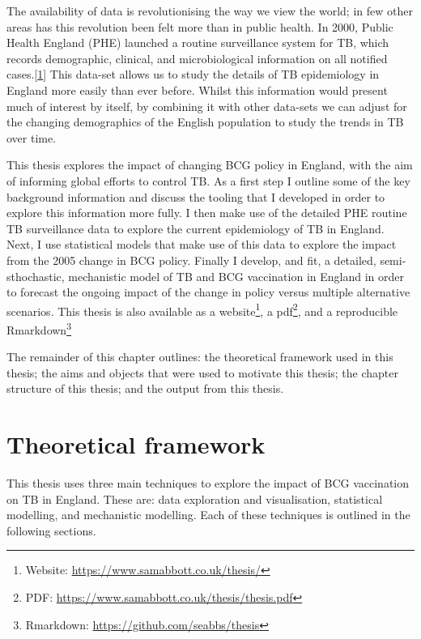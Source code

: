\documentclass[11pt,twoside]{bristolthesis}
\begin{document}
  The availability of data is revolutionising the way we view the world; in few other areas has this revolution been felt more than in public health. In 2000, Public Health England (PHE) launched a routine surveillance system for TB, which records demographic, clinical, and microbiological information on all notified cases.{[}\protect\hyperlink{ref-PHE2017}{1}{]} This data-set allows us to study the details of TB epidemiology in England more easily than ever before. Whilst this information would present much of interest by itself, by combining it with other data-sets we can adjust for the changing demographics of the English population to study the trends in TB over time.
  
  This thesis explores the impact of changing BCG policy in England, with the aim of informing global efforts to control TB. As a first step I outline some of the key background information and discuss the tooling that I developed in order to explore this information more fully. I then make use of the detailed PHE routine TB surveillance data to explore the current epidemiology of TB in England. Next, I use statistical models that make use of this data to explore the impact from the 2005 change in BCG policy. Finally I develop, and fit, a detailed, semi-sthochastic, mechanistic model of TB and BCG vaccination in England in order to forecast the ongoing impact of the change in policy versus multiple alternative scenarios. This thesis is also available as a website\footnote{Website: \url{https://www.samabbott.co.uk/thesis/}}, a pdf\footnote{PDF: \url{https://www.samabbott.co.uk/thesis/thesis.pdf}}, and a reproducible Rmarkdown\footnote{Rmarkdown: \url{https://github.com/seabbs/thesis}}
  
  The remainder of this chapter outlines: the theoretical framework used in this thesis; the aims and objects that were used to motivate this thesis; the chapter structure of this thesis; and the output from this thesis.
  
  \hypertarget{theoretical-framework}{%
  \section{Theoretical framework}\label{theoretical-framework}}
  
  This thesis uses three main techniques to explore the impact of BCG vaccination on TB in England. These are: data exploration and visualisation, statistical modelling, and mechanistic modelling. Each of these techniques is outlined in the following sections.
  
\end{document}
